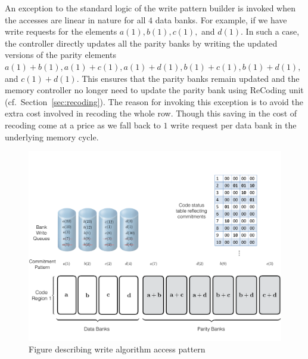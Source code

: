 \begin{remark}
An exception to the standard logic of the write pattern builder is invoked when the accesses are linear in nature for all $4$ data banks. For example, if we have write requests for the elements $a(1), b(1), c(1),$ and $d(1)$. In such a case, the controller directly updates all the parity banks by writing the updated versions of the parity elements $a(1) + b(1), a(1) + c(1), a(1) + d(1), b(1) + c(1), b(1) + d(1),$ and $c(1) + d(1)$. This ensures that the parity banks remain updated and the 
memory controller no longer need to update the parity bank using ReCoding unit (cf.~Section~\ref{sec:recoding}). The reason for invoking this exception is to avoid the extra cost involved in recoding the whole row. Though this saving in the cost of recoding come at a price as we fall back to $1$ write request per data bank in the underlying memory cycle. 
\end{remark}

\begin{figure}[t!]
\centering
         \includegraphics[width=\linewidth]{fig/Write-Algo-Example.pdf}
	\caption{Figure describing write algorithm access pattern}
	\label{fig:writeAlgoAccessPattern}
\end{figure}
